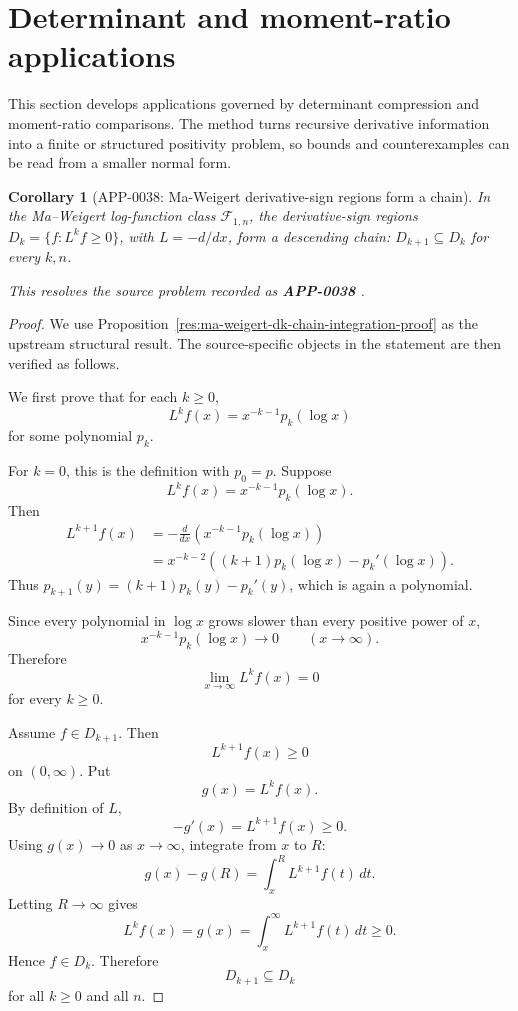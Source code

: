 \documentclass[11pt]{article}
\numberwithin{equation}{section}
\newtheorem{corollary}[theorem]{Corollary}
\theoremstyle{definition}
\theoremstyle{remark}
\newcommand{\1}{\mathbf 1}
\begin{document}
\section{Determinant and moment-ratio applications}
\label{sec:determinant-and-moment-ratio-applications}



This section develops applications governed by determinant compression and moment-ratio comparisons.  The method turns recursive derivative information into a finite or structured positivity problem, so bounds and counterexamples can be read from a smaller normal form.

\begin{corollary}[APP-0038: Ma-Weigert derivative-sign regions form a chain]
\label{res:ma-weigert-log-function-dk-chain-conjecture}
In the Ma--Weigert log-function class \(\mathcal F_{1,n}\), the derivative-sign regions \(D_k=\{f:L^k f\ge0\}\), with \(L=-d/dx\), form a descending chain: \(D_{k+1}\subseteq D_k\) for every \(k,n\).



This resolves the source problem recorded as \textbf{APP-0038} \cite{ma-weigert-log-functions}.
\end{corollary}

\begin{proof}
We use Proposition~\ref{res:ma-weigert-dk-chain-integration-proof} as the upstream structural result. The source-specific objects in the statement are then verified as follows.

We first prove that for each \(k\ge0\),
\[
L^k f(x)=x^{-k-1}p_k(\log x)
\]
for some polynomial \(p_k\).

For \(k=0\), this is the definition with \(p_0=p\).  Suppose
\[
L^k f(x)=x^{-k-1}p_k(\log x).
\]
Then
\[
\begin{aligned}
L^{k+1}f(x)
&=-\frac{d}{dx}\left(x^{-k-1}p_k(\log x)\right)\\
&=x^{-k-2}\left((k+1)p_k(\log x)-p_k'(\log x)\right).
\end{aligned}
\]
Thus \(p_{k+1}(y)=(k+1)p_k(y)-p_k'(y)\), which is again a polynomial.

Since every polynomial in \(\log x\) grows slower than every positive power of \(x\),
\[
x^{-k-1}p_k(\log x)\to0
\qquad (x\to\infty).
\]
Therefore
\[
\lim_{x\to\infty}L^k f(x)=0
\]
for every \(k\ge0\).

Assume \(f\in D_{k+1}\).  Then
\[
L^{k+1}f(x)\ge0
\]
on \((0,\infty)\).  Put
\[
g(x)=L^k f(x).
\]
By definition of \(L\),
\[
-g'(x)=L^{k+1}f(x)\ge0.
\]
Using \(g(x)\to0\) as \(x\to\infty\), integrate from \(x\) to \(R\):
\[
g(x)-g(R)=\int_x^R L^{k+1}f(t)\,dt.
\]
Letting \(R\to\infty\) gives
\[
L^k f(x)=g(x)=\int_x^\infty L^{k+1}f(t)\,dt\ge0.
\]
Hence \(f\in D_k\).  Therefore
\[
D_{k+1}\subseteq D_k
\]
for all \(k\ge0\) and all \(n\).
\end{proof}
\end{document}
